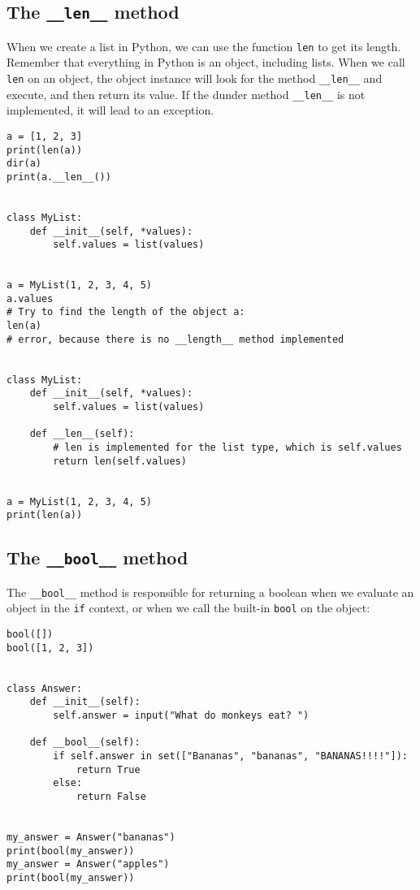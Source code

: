 \documentclass[12pt, a4paper]{article}
\begin{document}
\subsection{The \texttt{\_\_len\_\_} method}
\label{sec:org22a542a}
When we create a list in Python, we can use the function \texttt{len} to get its length.
Remember that everything in Python is an object, including lists.
When we call \texttt{len} on an object, the object instance will look for the method \texttt{\_\_len\_\_} and execute, and then return its value.
If the dunder method \texttt{\_\_len\_\_} is not implemented, it will lead to an exception.
\lstset{language=jupyter-python,label= ,caption= ,captionpos=b,numbers=none}
\begin{lstlisting}
a = [1, 2, 3]
print(len(a))
dir(a)
print(a.__len__())


class MyList:
    def __init__(self, *values):
        self.values = list(values)


a = MyList(1, 2, 3, 4, 5)
a.values
# Try to find the length of the object a:
len(a)
# error, because there is no __length__ method implemented


class MyList:
    def __init__(self, *values):
        self.values = list(values)

    def __len__(self):
        # len is implemented for the list type, which is self.values
        return len(self.values)


a = MyList(1, 2, 3, 4, 5)
print(len(a))
\end{lstlisting}
\subsection{The \texttt{\_\_bool\_\_} method}
\label{sec:org2d870ff}
The \texttt{\_\_bool\_\_} method is responsible for returning a boolean when we evaluate an object in the \texttt{if} context, or when we call the built-in \texttt{bool} on the object:
\lstset{language=jupyter-python,label= ,caption= ,captionpos=b,numbers=none}
\begin{lstlisting}
bool([])
bool([1, 2, 3])


class Answer:
    def __init__(self):
        self.answer = input("What do monkeys eat? ")

    def __bool__(self):
        if self.answer in set(["Bananas", "bananas", "BANANAS!!!!"]):
            return True
        else:
            return False


my_answer = Answer("bananas")
print(bool(my_answer))
my_answer = Answer("apples")
print(bool(my_answer))
\end{lstlisting}
\end{document}
